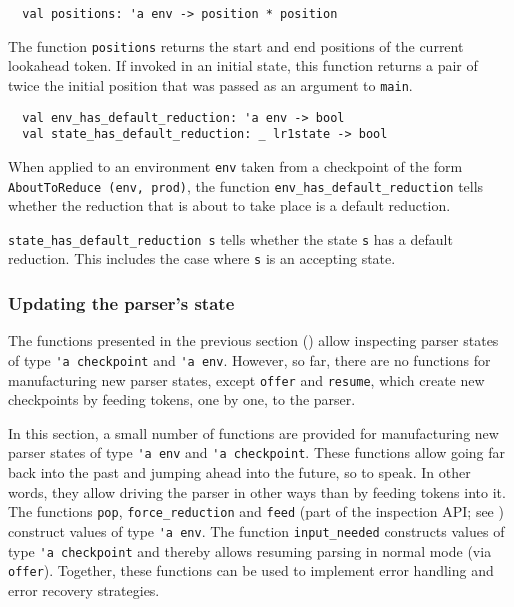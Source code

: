 \documentclass[onecolumn,11pt,nocopyrightspace,preprint]{sigplanconf}
\begin{document}

\begin{verbatim}
  val positions: 'a env -> position * position
\end{verbatim}

The function \verb+positions+ returns the start and end positions of the
current lookahead token. If invoked in an initial state, this function returns
a pair of twice the initial position that was passed as an argument
to \verb+main+.


\begin{verbatim}
  val env_has_default_reduction: 'a env -> bool
  val state_has_default_reduction: _ lr1state -> bool
\end{verbatim}

When applied to an environment \verb+env+ taken from a checkpoint of the form
\verb+AboutToReduce (env, prod)+, the function
\verb+env_has_default_reduction+ tells whether the reduction that is about to
take place is a default reduction.

\verb+state_has_default_reduction s+ tells whether the state \verb+s+ has a default
reduction. This includes the case where \verb+s+ is an accepting state.


\subsubsection{Updating the parser's state}
\label{sec:incremental:updating}

The functions presented in the previous section
() allow inspecting parser states of type
\verb+'a checkpoint+ and \verb+'a env+. However, so far, there are no
functions for manufacturing new parser states, except \verb+offer+ and
\verb+resume+, which create new checkpoints by feeding tokens, one by one, to
the parser.

In this section, a small number of functions are provided for manufacturing
new parser states of type \verb+'a env+ and \verb+'a checkpoint+. These
functions allow going far back into the past and jumping ahead into the
future, so to speak. In other words, they allow driving the parser in other
ways than by feeding tokens into it. The functions \verb+pop+,
\verb+force_reduction+ and \verb+feed+ (part of the inspection API; see
) construct values of type \verb+'a env+. The function
\verb+input_needed+ constructs values of type \verb+'a checkpoint+ and thereby
allows resuming parsing in normal mode (via \verb+offer+). Together, these
functions can be used to implement error handling and error recovery
strategies.
\end{document}
